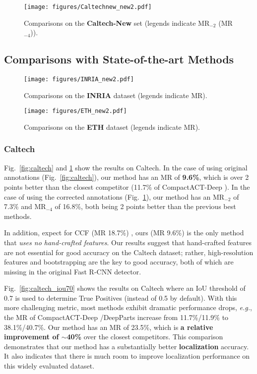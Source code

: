 \documentclass[runningheads]{llncs}
\def\eg{\emph{e.g.}}
\begin{document}
\begin{figure}[t] \centering
\texttt{[image: figures/Caltechnew\_new2.pdf]}
\caption{Comparisons on the \textbf{Caltech-New} set (legends indicate MR$_{-2}$ (MR$_{-4}$)).}
\label{fig:caltech-new}
\end{figure}




\subsection{Comparisons with State-of-the-art Methods}

\begin{figure}[t] \centering
\texttt{[image: figures/INRIA\_new2.pdf]}
\caption{Comparisons on the \textbf{INRIA} dataset (legends indicate MR).}
\label{fig:inria}
\texttt{[image: figures/ETH\_new2.pdf]}
\caption{Comparisons on the \textbf{ETH} dataset (legends indicate MR).}
\label{fig:eth}
\end{figure}



\subsubsection{Caltech} Fig.~\ref{fig:caltech} and  \ref{fig:caltech-new} show the results on Caltech. In the case of using original annotations (Fig.~\ref{fig:caltech}), our method has an MR of \textbf{9.6\%}, which is over 2 points better than the closest competitor (11.7\% of CompactACT-Deep \cite{cai2015learning}). In the case of using the corrected annotations (Fig.~\ref{fig:caltech-new}), our method has an MR$_{-2}$ of 7.3\% and MR$_{-4}$ of 16.8\%, both being 2 points better than the previous best methods.

In addition, expect for CCF (MR 18.7\%) \cite{yang2015convolutional}, ours (MR 9.6\%) is the only method  that \emph{uses no hand-crafted features}. Our results suggest that hand-crafted features are not essential for good accuracy on the Caltech dataset; rather, high-resolution features and bootstrapping are the key to good accuracy, both of which are missing in the original Fast R-CNN detector.

Fig.~\ref{fig:caltech_iou70} shows the results on Caltech where an IoU threshold of 0.7 is used to determine True Positives (instead of 0.5 by default). With this more challenging metric, most methods exhibit dramatic performance drops, \eg, the MR of CompactACT-Deep \cite{cai2015learning}/DeepParts \cite{tian2015deep} increase from 11.7\%/11.9\% to 38.1\%/40.7\%. Our method has an MR of 23.5\%, which is \textbf{a relative improvement of $\sim$40\%} over the closest competitors. This comparison demonstrates that our method has a substantially better \textbf{localization} accuracy. It also indicates that there is much room to improve localization performance on this widely evaluated dataset.
\end{document}
